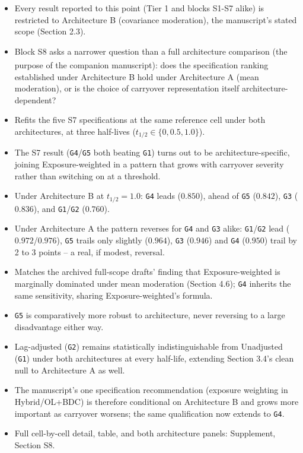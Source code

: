 \documentclass[
  11pt,
]{article}
\providecommand{\tightlist}{%
  \setlength{\itemsep}{0pt}\setlength{\parskip}{0pt}}
\begin{document}
\begin{itemize}
\tightlist
\item
  Every result reported to this point (Tier 1 and blocks S1-S7 alike)
  is restricted to Architecture B (covariance moderation), the
  manuscript's stated scope (Section 2.3).
\item
  Block S8 asks a narrower question than a full architecture
  comparison (the purpose of the companion manuscript\textsuperscript{}): does the specification
  ranking established under Architecture B hold under Architecture A
  (mean moderation), or is the choice of carryover representation
  itself architecture-dependent?
\item
  Refits the five S7 specifications at the same reference cell under
  both architectures, at three half-lives (\(t_{1/2} \in \{0, 0.5,
  1.0\}\)).
\item
  The S7 result (\texttt{G4}/\texttt{G5} both beating \texttt{G1}) turns out to be
  architecture-specific, joining Exposure-weighted in a pattern that
  grows with carryover severity rather than switching on at a
  threshold.
\item
  Under Architecture B at \(t_{1/2}=1.0\): \texttt{G4} leads (\(0.850\)), ahead
  of \texttt{G5} (\(0.842\)), \texttt{G3} (\(0.836\)), and \texttt{G1}/\texttt{G2} (\(0.760\)).
\item
  Under Architecture A the pattern reverses for \texttt{G4} and \texttt{G3} alike:
  \texttt{G1}/\texttt{G2} lead (\(0.972\)/\(0.976\)), \texttt{G5} trails only slightly
  (\(0.964\)), \texttt{G3} (\(0.946\)) and \texttt{G4} (\(0.950\)) trail by 2 to 3
  points -- a real, if modest, reversal.
\item
  Matches the archived full-scope drafts' finding that
  Exposure-weighted is marginally dominated under mean moderation
  (Section 4.6); \texttt{G4} inherits the same sensitivity, sharing
  Exposure-weighted's formula.
\item
  \texttt{G5} is comparatively more robust to architecture, never reversing
  to a large disadvantage either way.
\item
  Lag-adjusted (\texttt{G2}) remains statistically indistinguishable from
  Unadjusted (\texttt{G1}) under both architectures at every half-life,
  extending Section 3.4's clean null to Architecture A as well.
\item
  The manuscript's one specification recommendation (exposure
  weighting in Hybrid/OL+BDC) is therefore conditional on
  Architecture B and grows more important as carryover worsens; the
  same qualification now extends to \texttt{G4}.
\item
  Full cell-by-cell detail, table, and both architecture panels:
  Supplement, Section S8.
\end{itemize}
\end{document}

